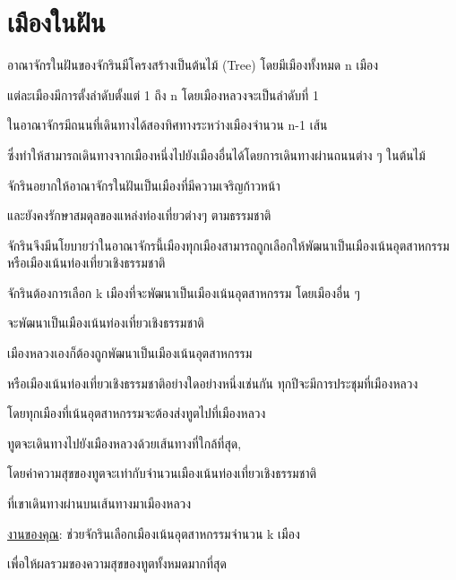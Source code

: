\documentclass{article}
\begin{document}
\section*{เมืองในฝัน}

อาณาจักรในฝันของจักรินมีโครงสร้างเป็นต้นไม้ (Tree) โดยมีเมืองทั้งหมด n เมือง

แต่ละเมืองมีการตั้งลำดับตั้งแต่ 1 ถึง n โดยเมืองหลวงจะเป็นลำดับที่ 1

ในอาณาจักรมีถนนที่เดินทางได้สองทิศทางระหว่างเมืองจำนวน n-1 เส้น

ซึ่งทำให้สามารถเดินทางจากเมืองหนึ่งไปยังเมืองอื่นได้โดยการเดินทางผ่านถนนต่าง ๆ ในต้นไม้



จักรินอยากให้อาณาจักรในฝันเป็นเมืองที่มีความเจริญก้าวหน้า

และยังคงรักษาสมดุลของแหล่งท่องเที่ยวต่างๆ ตามธรรมชาติ

จักรินจึงมีนโยบายว่าในอาณาจักรนี้เมืองทุกเมืองสามารถถูกเลือกให้พัฒนาเป็นเมืองเน้นอุตสาหกรรมหรือเมืองเน้นท่องเที่ยวเชิงธรรมชาติ

จักรินต้องการเลือก k เมืองที่จะพัฒนาเป็นเมืองเน้นอุตสาหกรรม โดยเมืองอื่น ๆ

จะพัฒนาเป็นเมืองเน้นท่องเที่ยวเชิงธรรมชาติ

เมืองหลวงเองก็ต้องถูกพัฒนาเป็นเมืองเน้นอุตสาหกรรม

หรือเมืองเน้นท่องเที่ยวเชิงธรรมชาติอย่างใดอย่างหนึ่งเช่นกัน ทุกปีจะมีการประชุมที่เมืองหลวง

โดยทุกเมืองที่เน้นอุตสาหกรรมจะต้องส่งทูตไปที่เมืองหลวง

ทูตจะเดินทางไปยังเมืองหลวงด้วยเส้นทางที่ใกล้ที่สุด,

โดยค่าความสุขของทูตจะเท่ากับจำนวนเมืองเน้นท่องเที่ยวเชิงธรรมชาติ

ที่เขาเดินทางผ่านบนเส้นทางมาเมืองหลวง



\ul{งานของคุณ}: ช่วยจักรินเลือกเมืองเน้นอุตสาหกรรมจำนวน k เมือง

เพื่อให้ผลรวมของความสุขของทูตทั้งหมดมากที่สุด



\hfill\break
\end{document}
